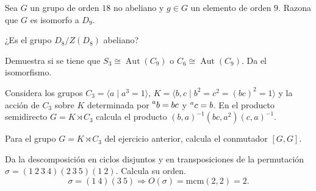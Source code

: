 \documentclass[12pt]{article}
\DeclareMathOperator{\Aut}{Aut}
\begin{document}
    \begin{ejercicio}
        Sea $G$ un grupo de orden $18$ no abeliano y $g \in G$ un elemento de orden $9$. Razona que $G$ es isomorfo a $D_9$.
    \end{ejercicio}

    \begin{ejercicio}
        ¿Es el grupo $D_8 /Z(D_8)$ abeliano?
    \end{ejercicio}

    \begin{ejercicio}
        Demuestra si se tiene que $S_3 \cong \Aut(C_9)$ o $C_6 \cong \Aut(C_9)$. Da el isomorfismo.
    \end{ejercicio}

    \begin{ejercicio}
        Considera los grupos $C_3 = \langle a\mid a^3 = 1\rangle$, $K = \langle b, c\mid b^2 = c^2 = (bc)^2 = 1\rangle$ y la acción de $C_3$ sobre $K$ determinada por $\prescript{a}{}{b} = bc$ y $\prescript{a}{}{c} = b$. En el producto semidirecto $G = K \rtimes C_3$ calcula el producto $(b, a)^{-1}(bc, a^2)(c, a)^{-1}$.
    \end{ejercicio}

    \begin{ejercicio}
        Para el grupo $G = K \rtimes C_3$ del ejercicio anterior, calcula el conmutador $[G, G]$.
    \end{ejercicio}



    \newpage
    \setcounter{ejercicio}{0}

    \begin{ejercicio}
        Da la descomposición en ciclos disjuntos y en transposiciones de la permutación $\sigma = (1\ 2\ 3\ 4)(2\ 3\ 5)(1\ 2)$. Calcula su orden.
        \begin{equation*}
            \sigma = (1\ 4)(3\ 5)\Longrightarrow
            O(\sigma) = \text{mcm}(2,2) = 2.
        \end{equation*}
    \end{ejercicio}
\end{document}
